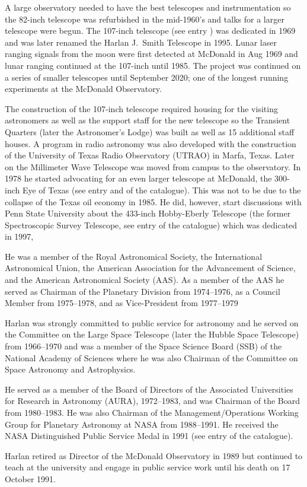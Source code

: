 A large observatory needed to have the best telescopes and
instrumentation so the 82-inch telescope was refurbished in the
mid-1960's and talks for a larger telescope were begun.  The 107-inch
telescope (see entry ) was dedicated in 1969 and was later
renamed the Harlan J.~Smith Telescope in 1995. Lunar laser ranging
signals from the moon were first detected at McDonald in Aug 1969 and
lunar ranging continued at the 107-inch until 1985. The project was
continued on a series of smaller telescopes until September 2020; one
of the longest running experiments at the McDonald Observatory.

The construction of the 107-inch telescope required housing for the
visiting astronomers as well as the support staff for the
new telescope so the Transient Quarters (later the Astronomer's Lodge) was
built as well as 15 additional staff houses. A program in radio
astronomy was also developed with the construction of the University of
Texas Radio Observatory (UTRAO) in Marfa, Texas. Later on the
Millimeter Wave Telescope was moved from campus to the
observatory. In 1978 he started advocating for an even larger
telescope at McDonald, the 300-inch Eye of Texas (see
entry  and  of the catalogue). This was not to
be due to the collapse of the Texas oil economy in 1985. He did,
however, start discussions with Penn State University about the
433-inch Hobby-Eberly Telescope (the former Spectroscopic Survey
Telescope, see entry  of the catalogue) which was dedicated
in 1997,

He was a member of the Royal Astronomical Society, the International
Astronomical Union, the American Association for the Advancement of
Science, and the American Astronomical Society (AAS). As a member of
the AAS he served as Chairman of the Planetary Division from
1974--1976, as a Council Member from 1975--1978, and as Vice-President
from 1977--1979

Harlan was strongly committed to public service for astronomy and he
served on the Committee on the Large Space Telescope
(later the Hubble Space Telescope) from 1966--1970 and was a member of the
Space Science Board (SSB) of the National Academy of Sciences where he
was also Chairman of the Committee on Space Astronomy and
Astrophysics.

He served as a member of the Board of Directors of the Associated
Universities for Research in Astronomy (AURA), 1972--1983, and was
Chairman of the Board from 1980--1983. He was also Chairman of the
Management/Operations Working Group for Planetary Astronomy at NASA
from 1988--1991.  He received the NASA Distinguished Public Service
Medal in 1991 (see entry  of the catalogue).

Harlan retired as Director of the McDonald Observatory in 1989  but
continued to teach at the university and engage in public service work
until his death on 17 October 1991.


